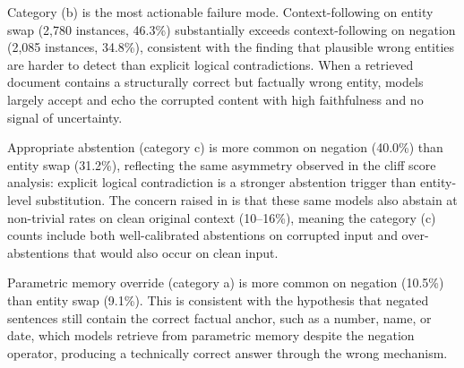 \documentclass[11pt]{article}
\begin{document}
Category (b) is the most actionable failure mode. Context-following on entity swap
(2,780 instances, 46.3\%) substantially exceeds context-following on negation (2,085
instances, 34.8\%), consistent with the finding that plausible wrong entities are harder
to detect than explicit logical contradictions. When a retrieved document contains a
structurally correct but factually wrong entity, models largely accept and echo the
corrupted content with high faithfulness and no signal of uncertainty.

Appropriate abstention (category c) is more common on negation (40.0\%) than entity swap
(31.2\%), reflecting the same asymmetry observed in the cliff score analysis: explicit
logical contradiction is a stronger abstention trigger than entity-level substitution.
The concern raised in  is that these same models also abstain at
non-trivial rates on clean original context (10--16\%), meaning the category (c) counts
include both well-calibrated abstentions on corrupted input and over-abstentions that
would also occur on clean input.

Parametric memory override (category a) is more common on negation (10.5\%) than entity
swap (9.1\%). This is consistent with the hypothesis that negated sentences still contain
the correct factual anchor, such as a number, name, or date, which models retrieve from
parametric memory despite the negation operator, producing a technically correct answer
through the wrong mechanism.
\end{document}
